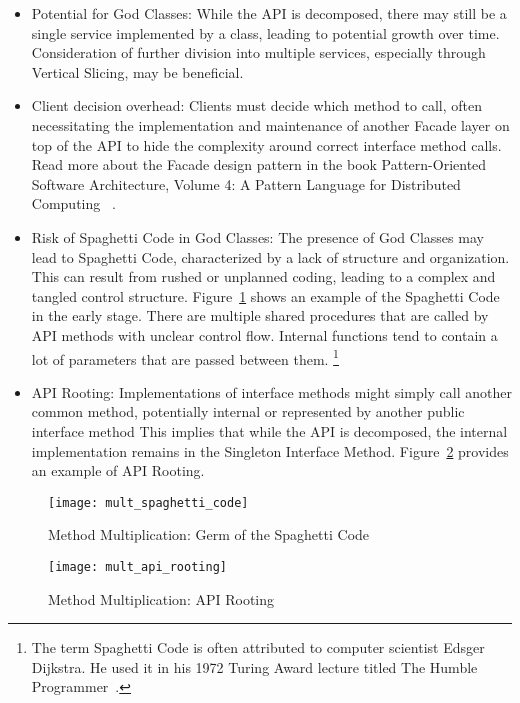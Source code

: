 \begin{itemize}
    \item Potential for God Classes:
    While the API is decomposed, there may still be a single service implemented by a class, leading to potential
    growth over time.
    Consideration of further division into multiple services, especially through Vertical Slicing, may be beneficial.
    \item Client decision overhead:
    Clients must decide which method to call, often necessitating the implementation and maintenance of another
    Facade layer on top of the API to hide the complexity around correct interface method calls.
    Read more about the Facade design pattern in the book Pattern-Oriented Software Architecture, Volume 4:
    A Pattern Language for Distributed Computing ~\cite[Chapter~12]{posa4}.
    \item Risk of Spaghetti Code in God Classes:
    The presence of God Classes may lead to Spaghetti Code, characterized by a lack of structure and organization.
    This can result from rushed or unplanned coding, leading to a complex and tangled control structure.
    Figure~\ref{fig:mult_spaghetti_code} shows an example of the Spaghetti Code in the early stage.
    There are multiple shared procedures that are called by API methods with unclear control flow.
    Internal functions tend to contain a lot of parameters that are passed between them.
    \footnote{
        The term Spaghetti Code is often attributed to computer scientist Edsger Dijkstra.
        He used it in his 1972 Turing Award lecture titled The Humble Programmer~\cite{dijkstra1972humble}.
    }
    \item API Rooting:
    Implementations of interface methods might simply call another common method, potentially internal or represented
    by another public interface method
    This implies that while the API is decomposed, the internal implementation remains
    in the Singleton Interface Method.
    Figure~\ref{fig:mult_api_rooting} provides an example of API Rooting.
\end{itemize}

\begin{figure}[!htb]
    \centering
    \texttt{[image: mult\_spaghetti\_code]}
    \caption{Method Multiplication: Germ of the Spaghetti Code}
    \label{fig:mult_spaghetti_code}
\end{figure}

\begin{figure}[!htb]
    \centering
    \texttt{[image: mult\_api\_rooting]}
    \caption{Method Multiplication: API Rooting}
    \label{fig:mult_api_rooting}
\end{figure}

